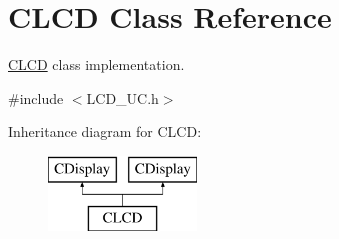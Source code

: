 \hypertarget{class_c_l_c_d}{}\section{C\+L\+CD Class Reference}
\label{class_c_l_c_d}


\mbox{\hyperlink{class_c_l_c_d}{C\+L\+CD}} class implementation.  




{\ttfamily \#include $<$L\+C\+D\+\_\+\+U\+C.\+h$>$}

Inheritance diagram for C\+L\+CD\+:\begin{figure}[H]
\begin{center}
\leavevmode
\includegraphics[height=2.000000cm]{class_c_l_c_d}
\end{center}
\end{figure}
